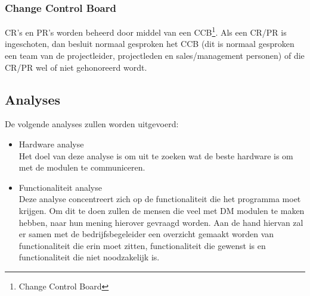 \subsubsection{Change Control Board}
\label{CCB}
CR's en PR's worden beheerd door middel van een CCB\footnote{Change Control Board}. Als een CR/PR is ingeschoten, dan besluit normaal gesproken het CCB (dit is normaal gesproken een team van de projectleider, projectleden en sales/management personen) of die CR/PR wel of niet gehonoreerd wordt.

\subsection{Analyses}

De volgende analyses zullen worden uitgevoerd:

\begin{itemize}
\item {}Hardware analyse \\
Het doel van deze analyse is om uit te zoeken wat de beste hardware is om met de modulen te communiceren.
\item {}Functionaliteit analyse \\
Deze analyse concentreert zich op de functionaliteit die het programma moet krijgen. Om dit te doen zullen de mensen die veel met DM modulen te maken hebben, naar hun mening hierover gevraagd worden. Aan de hand hiervan zal er samen met de bedrijfsbegeleider een overzicht gemaakt worden van functionaliteit die erin moet zitten, functionaliteit die gewenst is en functionaliteit die niet noodzakelijk is.
\end{itemize}
